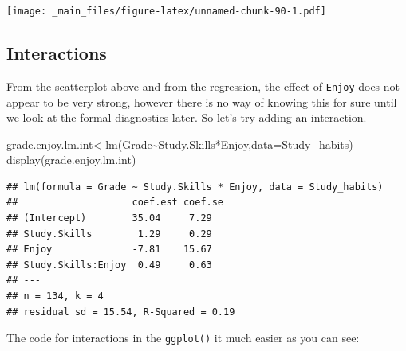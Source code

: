 \documentclass[
]{gitbook}
\newenvironment{Shaded}{\begin{snugshade}}{\end{snugshade}}
\newcommand{\AttributeTok}[1]{\textcolor[rgb]{0.77,0.63,0.00}{#1}}
\newcommand{\FunctionTok}[1]{\textcolor[rgb]{0.00,0.00,0.00}{#1}}
\newcommand{\NormalTok}[1]{#1}
\newcommand{\OtherTok}[1]{\textcolor[rgb]{0.56,0.35,0.01}{#1}}
\newcommand{\SpecialCharTok}[1]{\textcolor[rgb]{0.00,0.00,0.00}{#1}}
\begin{document}
\texttt{[image: \_main\_files/figure-latex/unnamed-chunk-90-1.pdf]}

\hypertarget{interactions}{%
\subsection{Interactions}\label{interactions}}

From the scatterplot above and from the regression, the effect of \texttt{Enjoy} does not appear to be very strong, however there is no way of knowing this for sure until we look at the formal diagnostics later. So let's try adding an interaction.

\begin{Shaded}
\begin{Highlighting}[]
\NormalTok{grade.enjoy.lm.int}\OtherTok{\textless{}{-}}\FunctionTok{lm}\NormalTok{(Grade}\SpecialCharTok{\textasciitilde{}}\NormalTok{Study.Skills}\SpecialCharTok{*}\NormalTok{Enjoy,}\AttributeTok{data=}\NormalTok{Study\_habits)}
\FunctionTok{display}\NormalTok{(grade.enjoy.lm.int)}
\end{Highlighting}
\end{Shaded}

\begin{verbatim}
## lm(formula = Grade ~ Study.Skills * Enjoy, data = Study_habits)
##                    coef.est coef.se
## (Intercept)        35.04     7.29  
## Study.Skills        1.29     0.29  
## Enjoy              -7.81    15.67  
## Study.Skills:Enjoy  0.49     0.63  
## ---
## n = 134, k = 4
## residual sd = 15.54, R-Squared = 0.19
\end{verbatim}


\newpage

The code for interactions in the \texttt{ggplot()} it much easier as you can see:
\end{document}
